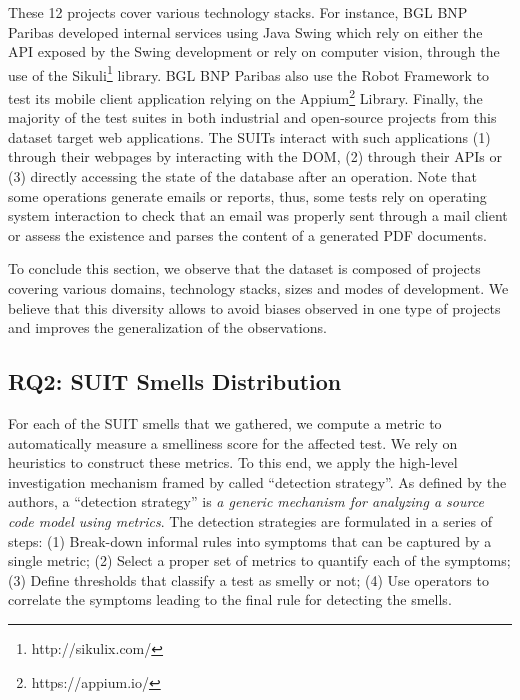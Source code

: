 \begin{table}
\begin{tabular}{LRRRR}
\bottomrule

\end{tabular}

\end{table}

These 12 projects cover various technology stacks. For instance, BGL BNP Paribas developed internal services using Java Swing which rely on either the API exposed by the Swing development or rely on computer vision, through the use of the Sikuli\footnote{http://sikulix.com/} library. BGL BNP Paribas also use the Robot Framework to test its mobile client application relying on the Appium\footnote{https://appium.io/} Library. Finally, the majority of the test suites in both industrial and open-source projects from this dataset target web applications. The SUITs interact with such applications (1) through their webpages by interacting with the DOM, (2) through their APIs or (3) directly accessing the state of the database after an operation. Note that some operations generate emails or reports, thus, some tests rely on operating system interaction to check that an email was properly sent through a mail client or assess the existence and parses the content of a generated PDF documents.

To conclude this section, we observe that the dataset is composed of projects covering various domains, technology stacks, sizes and modes of development. We believe that this diversity allows to avoid biases observed in one type of projects and improves the generalization of the observations.

\subsection{RQ2: SUIT Smells Distribution}
\label{sec:smell-detection}

For each of the SUIT smells that we gathered, we compute a metric to automatically measure a smelliness score for the affected test. We rely on heuristics to construct these metrics. To this end, we apply the high-level investigation mechanism framed by \textcite{Marinescu2004} called ``detection strategy''. As defined by the authors, a ``detection strategy'' is \emph{a generic mechanism for analyzing a source code model using metrics}. The detection strategies are formulated in a series of steps: (1) Break-down informal rules into symptoms that can be captured by a single metric; (2) Select a proper set of metrics to quantify each of the symptoms; (3) Define thresholds that classify a test as smelly or not; (4) Use operators to correlate the symptoms leading to the final rule for detecting the smells.

